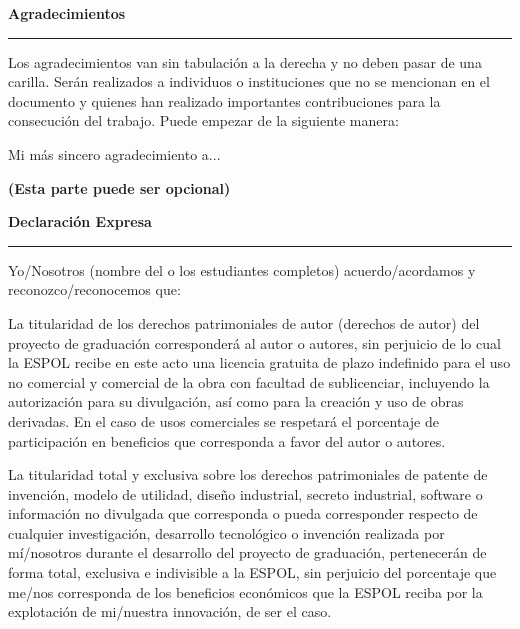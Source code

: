 \documentclass[12pt,oneside]{report}
\newcommand{\encabezadolinea}[1]{%
  {\centering\bfseries #1\par}\vspace{-0.6\baselineskip}\noindent\rule{\textwidth}{0.6pt}\par}
\begin{document}
\clearpage
\encabezadolinea{Agradecimientos}
\vspace*{\fill}
\hfill
\begin{minipage}{0.45\textwidth}
\RaggedRight\setlength{\parindent}{0pt}\setlength{\parskip}{6pt}
Los agradecimientos van sin tabulación a la derecha y no deben pasar de una carilla. Serán realizados a individuos o instituciones que no se mencionan en el documento y quienes han realizado importantes contribuciones para la consecución del trabajo. Puede empezar de la siguiente manera:

Mi más sincero agradecimiento a...

\textbf{(Esta parte puede ser opcional)}
\end{minipage}
\vspace*{\fill}

\clearpage
\encabezadolinea{Declaración Expresa}
\begingroup
\onehalfspacing
\justifying
\setlength{\parindent}{0pt}
\setlength{\parskip}{6pt}
\small
\vspace{0.5cm}

Yo/Nosotros (nombre del o los estudiantes completos) acuerdo/acordamos y reconozco/reconocemos que:

La titularidad de los derechos patrimoniales de autor (derechos de autor) del proyecto de graduación corresponderá al autor o autores, sin perjuicio de lo cual la ESPOL recibe en este acto una licencia gratuita de plazo indefinido para el uso no comercial y comercial de la obra con facultad de sublicenciar, incluyendo la autorización para su divulgación, así como para la creación y uso de obras derivadas. En el caso de usos comerciales se respetará el porcentaje de participación en beneficios que corresponda a favor del autor o autores.

La titularidad total y exclusiva sobre los derechos patrimoniales de patente de invención, modelo de utilidad, diseño industrial, secreto industrial, software o información no divulgada que corresponda o pueda corresponder respecto de cualquier investigación, desarrollo tecnológico o invención realizada por mí/nosotros durante el desarrollo del proyecto de graduación, pertenecerán de forma total, exclusiva e indivisible a la ESPOL, sin perjuicio del porcentaje que me/nos corresponda de los beneficios económicos que la ESPOL reciba por la explotación de mi/nuestra innovación, de ser el caso.
\end{document}
